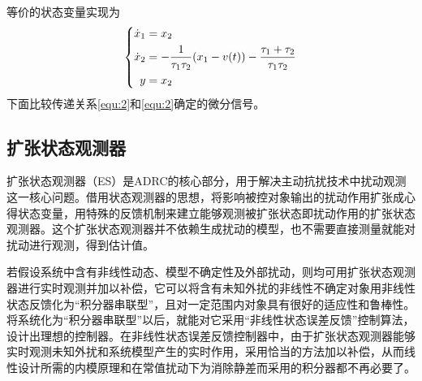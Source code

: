 等价的状态变量实现为
\begin{equation}
\centering
\label{}
\left\{ \begin{aligned}
\dot x_1 &= x_2\\
\dot x_2 &= - \frac{1}{{\tau_1\tau_2}}(x_1 - v(t)) - \frac{{\tau_1 + \tau_2}}{{\tau_1\tau_2}}\\
y &= x_2
\end{aligned} \right.
\end{equation}
下面比较传递关系\ref{equ:2}和\ref{equ:2}确定的微分信号。

\subsection{扩张状态观测器}
扩张状态观测器（ES）是ADRC的核心部分，用于解决主动抗扰技术中扰动观测这一核心问题。借用状态观测器的思想，将影响被控对象输出的扰动作用扩张成心得状态变量，用特殊的反馈机制来建立能够观测被扩张状态即扰动作用的扩张状态观测器。这个扩张状态观测器并不依赖生成扰动的模型，也不需要直接测量就能对扰动进行观测，得到估计值。

若假设系统中含有非线性动态、模型不确定性及外部扰动，则均可用扩张状态观测器进行实时观测并加以补偿，它可以将含有未知外扰的非线性不确定对象用非线性状态反馈化为“积分器串联型”，且对一定范围内对象具有很好的适应性和鲁棒性。将系统化为“积分器串联型”以后，就能对它采用“非线性状态误差反馈”控制算法，设计出理想的控制器。在非线性状态误差反馈控制器中，由于扩张状态观测器能够实时观测未知外扰和系统模型产生的实时作用，采用恰当的方法加以补偿，从而线性设计所需的内模原理和在常值扰动下为消除静差而采用的积分器都不再必要了。

